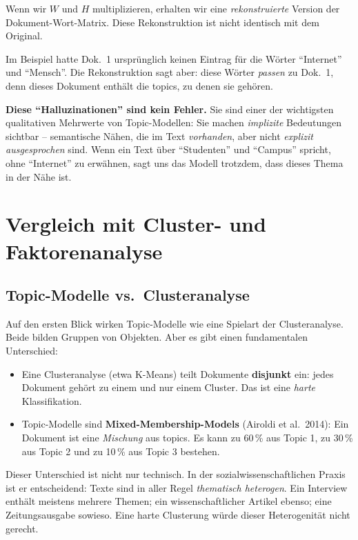 \documentclass[a4paper,11pt]{article}
\begin{document}
Wenn wir $W$ und $H$ multiplizieren, erhalten wir eine
\emph{rekonstruierte} Version der Dokument-Wort-Matrix. Diese
Rekonstruktion ist nicht identisch mit dem Original.

Im Beispiel hatte Dok.\ 1 ursprünglich keinen Eintrag für die Wörter
\enquote{Internet} und \enquote{Mensch}. Die Rekonstruktion sagt aber:
diese Wörter \emph{passen} zu Dok.\ 1, denn dieses Dokument enthält
die topics, zu denen sie gehören.

\begin{merkbox}
\textbf{Diese \enquote{Halluzinationen} sind kein Fehler.} Sie sind
einer der wichtigsten qualitativen Mehrwerte von Topic-Modellen:
Sie machen \emph{implizite} Bedeutungen sichtbar -- semantische
Nähen, die im Text \emph{vorhanden}, aber nicht \emph{explizit
ausgesprochen} sind. Wenn ein Text über \enquote{Studenten} und
\enquote{Campus} spricht, ohne \enquote{Internet} zu erwähnen, sagt
uns das Modell trotzdem, dass dieses Thema in der Nähe ist.
\end{merkbox}

\section{Vergleich mit Cluster- und Faktorenanalyse}

\subsection{Topic-Modelle vs.\ Clusteranalyse}

Auf den ersten Blick wirken Topic-Modelle wie eine Spielart der
Clusteranalyse. Beide bilden Gruppen von Objekten. Aber es gibt einen
fundamentalen Unterschied:

\begin{itemize}
\item Eine Clusteranalyse (etwa K-Means) teilt Dokumente
\textbf{disjunkt} ein: jedes Dokument gehört zu einem und nur einem
Cluster. Das ist eine \emph{harte} Klassifikation.

\item Topic-Modelle sind \textbf{Mixed-Membership-Models}
(Airoldi et al.\ 2014): Ein Dokument ist eine \emph{Mischung} aus
topics. Es kann zu 60\,\% aus Topic 1, zu 30\,\% aus Topic 2 und zu
10\,\% aus Topic 3 bestehen.
\end{itemize}

Dieser Unterschied ist nicht nur technisch. In der
sozialwissenschaftlichen Praxis ist er entscheidend: Texte sind in
aller Regel \emph{thematisch heterogen}. Ein Interview enthält
meistens mehrere Themen; ein wissenschaftlicher Artikel ebenso; eine
Zeitungsausgabe sowieso. Eine harte Clusterung würde dieser
Heterogenität nicht gerecht.
\end{document}
